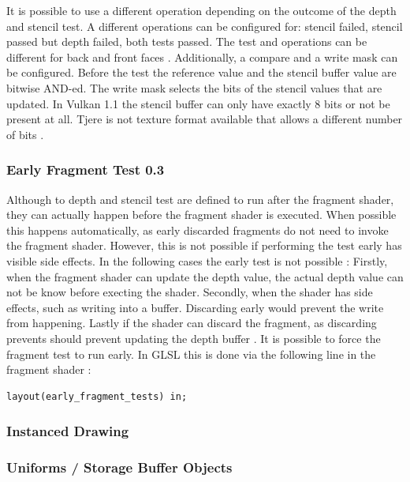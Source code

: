 It is possible to use a different operation depending on the outcome of the depth and stencil test. A different operations can be configured for: stencil failed, stencil passed but depth failed, both tests passed. The test and operations can be different for back and front faces \cite{sellers:vulkanprogramming}. Additionally, a compare and a write mask can be configured. Before the test the reference value and the stencil buffer value are bitwise AND-ed. The write mask selects the bits of the stencil values that are updated. In Vulkan 1.1 the stencil buffer can only have exactly 8 bits or not be present at all. Tjere is not texture format available that allows a different number of bits \cite{khronos:vulkan:spec1.1}.

\subsubsection{Early Fragment Test 0.3}
Although to depth and stencil test are defined to run after the fragment shader, they can actually happen before the fragment shader is executed. When possible this happens automatically, as early discarded fragments do not need to invoke the fragment shader. However, this is not possible if performing the test early has visible side effects. In the following cases the early test is not possible \cite{sellers:vulkanprogramming}:
Firstly, when the fragment shader can update the depth value, the actual depth value can not be know before execting the shader. Secondly, when the shader has side effects, such as writing into a buffer. Discarding early would prevent the write from happening. Lastly if the shader can discard the fragment, as discarding prevents should prevent updating the depth buffer \cite{sellers:vulkanprogramming}. It is possible to force the fragment test to run early. In GLSL this is done via the following line in the fragment shader \cite{khronos:glsl4.60:spec}:
\begin{lstlisting}
layout(early_fragment_tests) in;
\end{lstlisting}


\subsubsection{Instanced Drawing}


\subsubsection{Uniforms / Storage Buffer Objects}



